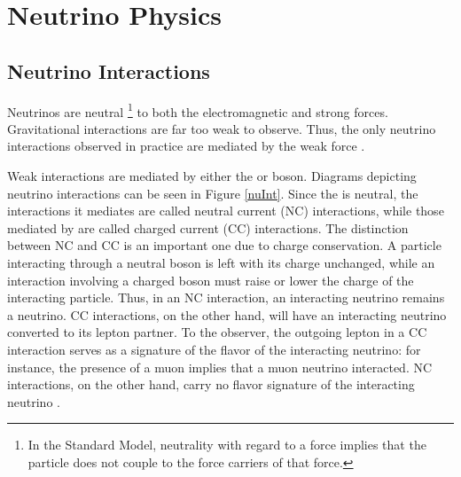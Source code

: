 \chapter{Neutrino Physics}
\label{nu_osc_chapter}

\section{Neutrino Interactions}

Neutrinos are neutral
\footnote{In the Standard Model, neutrality with regard to a force implies that
the particle does not couple to the force carriers of that force.}
to both the electromagnetic and strong forces.
Gravitational interactions are far too weak to observe.
Thus, the only neutrino interactions observed in practice are mediated
by the weak force \cite{halzen1984quarks}.

Weak interactions are mediated by either the \wb or \zb boson.
Diagrams depicting neutrino interactions can be seen in Figure \ref{nuInt}.
Since the \zb is neutral, the interactions it mediates are called
neutral current (NC) interactions, while those mediated by \wb are called
charged current (CC) interactions.
The distinction between NC and CC is an important one due to charge
conservation.
A particle interacting through a neutral boson is left with its charge
unchanged, while an interaction involving a charged boson must raise
or lower the charge of the interacting particle.
Thus, in an NC interaction, an interacting neutrino remains a neutrino.
CC interactions, on the other hand, will have an interacting neutrino converted
to its lepton partner.
To the observer, the outgoing lepton in a CC interaction serves as a signature
of the flavor of the interacting neutrino: for instance,
the presence of a muon implies that a muon neutrino interacted.
NC interactions, on the other hand, carry no flavor signature of the
interacting neutrino \cite{ho2010elementary}.

